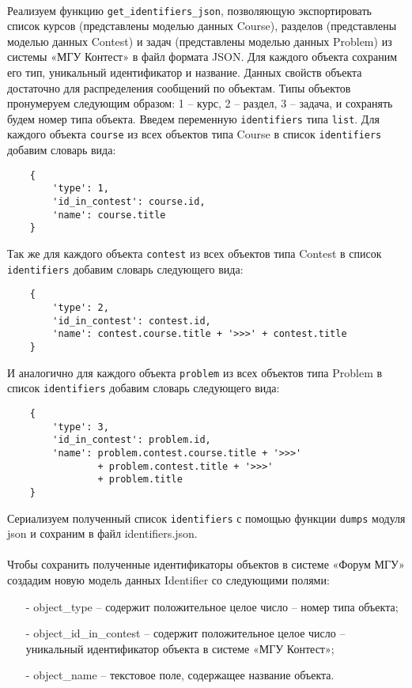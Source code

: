 \documentclass[12pt, a4paper, oneside]{article}
\begin{document}
\paragraph{}
Реализуем функцию \texttt{get\_identifiers\_json}, позволяющую экспортировать список курсов (представлены моделью данных Course), разделов (представлены моделью данных Contest) и задач (представлены моделью данных Problem) из системы «МГУ Контест» в файл формата JSON. Для каждого объекта сохраним его тип, уникальный идентификатор и название. Данных свойств объекта достаточно для распределения сообщений по объектам. Типы объектов пронумеруем следующим образом: 1 – курс, 2 – раздел, 3 – задача, и сохранять будем номер типа объекта. Введем переменную \texttt{identifiers} типа \texttt{list}. Для каждого объекта \texttt{course} из всех объектов типа Course в список \texttt{identifiers} добавим словарь вида:
\begin{verbatim}
    {
        'type': 1,
        'id_in_contest': course.id,
        'name': course.title
    }
\end{verbatim}
Так же для каждого объекта \texttt{contest} из всех объектов типа Contest в список \texttt{identifiers} добавим словарь следующего вида:
\begin{verbatim}
    {
        'type': 2,
        'id_in_contest': contest.id,
        'name': contest.course.title + '>>>' + contest.title
    }
\end{verbatim}
И аналогично для каждого объекта \texttt{problem} из всех объектов типа Problem в список \texttt{identifiers} добавим словарь следующего вида:
\begin{verbatim}
    {
        'type': 3,
        'id_in_contest': problem.id,
        'name': problem.contest.course.title + '>>>' 
                + problem.contest.title + '>>>' 
                + problem.title
    }
\end{verbatim}
Сериализуем полученный список \texttt{identifiers} с помощью функции \texttt{dumps} модуля json и сохраним в файл identifiers.json.
\paragraph{}
Чтобы сохранить полученные идентификаторы объектов в системе «Форум МГУ» создадим новую модель данных Identifier со следующими полями:
\begin{itemize}
    \item[-] object\_type – содержит положительное целое число – номер типа объекта;
    \item[-] object\_id\_in\_contest – содержит положительное целое число – уникальный идентификатор объекта в системе «МГУ Контест»;
    \item[-] object\_name – текстовое поле, содержащее название объекта.
\end{itemize}
\end{document}
